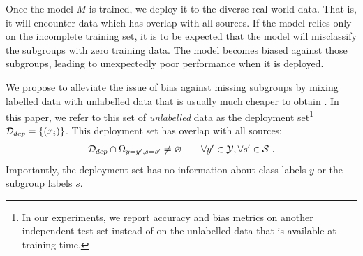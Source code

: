 Once the model $M$ is trained, we deploy it to the diverse real-world data.
%
That is, it will encounter data which has overlap with all sources.
If the model relies only on the incomplete training set, it is to be expected that the model will misclassify the subgroups with zero training data.
%
The model becomes biased against those subgroups, leading to unexpectedly poor performance when it is deployed.
%

%
We propose to alleviate the issue of bias against missing subgroups by mixing labelled data with unlabelled data that is usually much cheaper to obtain \citep{ChaSchZie06}. 
%
In this paper, we refer to this set of \emph{unlabelled} data as the
deployment set\footnote{In our experiments, we report accuracy and bias metrics on another independent test set instead of on the unlabelled data that is available at training time.} ${\mathcal{D}}_{dep} =\{(x_i)\}$.
%
This 
deployment set has overlap with all sources:
\begin{align}
  {\mathcal{D}}_{dep} \cap \Omega_{y=y',s=s'} \neq \varnothing\quad\quad\forall y'\in{\mathcal{Y}},\forall s'\in{\mathcal{S}}~.
\end{align}
Importantly, the deployment set has no information about class labels $y$ or the subgroup labels $s$.

